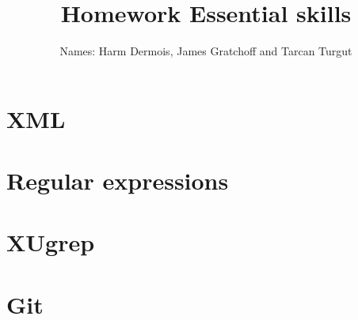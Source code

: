 \documentclass[12pt,a4paper]{article}
\begin{document}
\title{Homework Essential skills}
\author{Names: Harm Dermois, James Gratchoff and Tarcan Turgut }
\date{}
\maketitle

\section{XML}

\section{Regular expressions}

\section{XUgrep}

\section{Git}

\end{document}
